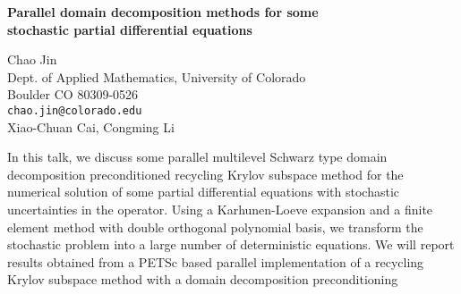 \documentclass{report}
\begin{document}

\begin{center}
{\large
{\bf Parallel domain decomposition methods for some \\
	stochastic partial differential equations}}

	Chao Jin \\
	Dept. of Applied Mathematics, University of Colorado \\
	Boulder  CO  80309-0526 \\
	{\tt chao.jin@colorado.edu} \\
	Xiao-Chuan Cai, Congming Li
\end{center}
In this talk, we discuss some  parallel multilevel Schwarz
type domain decomposition preconditioned recycling Krylov
subspace method for the numerical solution of some partial
differential equations with stochastic uncertainties in the
operator. Using a Karhunen-Loeve expansion and a finite
element method with double orthogonal polynomial basis, we
transform the stochastic problem into a large number of
deterministic equations. We will report results obtained
from a PETSc based parallel implementation of a recycling
Krylov subspace method with a domain decomposition
preconditioning



\end{document}
